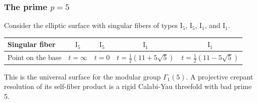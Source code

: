 \documentclass[a4paper]{amsart}
\theoremstyle{plain}
\theoremstyle{definition}
\theoremstyle{remark}
\numberwithin{equation}{section}
\begin{document}
\subsubsection*{The prime $p=5$}
Consider the elliptic surface with singular fibers of types
$\mathrm{I_{5}}$, $\mathrm{I}_{5}$, $\mathrm{I}_{1}$, and $\mathrm{I}_{1}$.
\begin{table}[H]
	\centering
	\renewcommand{\arraystretch}{1.2}
	\begin{tabular}{lcccc}
		\toprule
		Singular fiber
		& $\mathrm{I_{5}}$
		& $\mathrm{I}_{5}$
		& $\mathrm{I}_{1}$ & $\mathrm{I}_{1}$ \\
		\midrule
		Point on the base & $t=\infty$ & $t=0$ & $t=\frac12(11+5\sqrt5)$ & $t=\frac12(11-5\sqrt5)$ \\
		\bottomrule
	\end{tabular}
\end{table}
This is the universal surface for the modular group $\Gamma_{1}(5)$.
A projective crepant resolution of its self-fiber product is a rigid Calabi-Yau threefold with bad prime 5.
%
\end{document}
